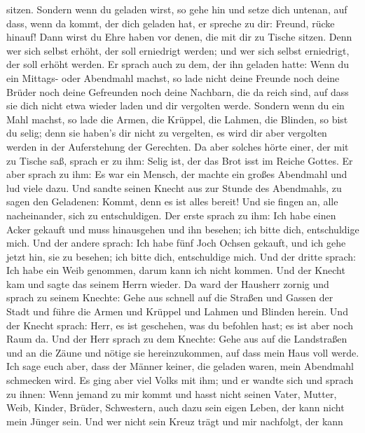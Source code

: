 sitzen.  Sondern wenn du geladen wirst, so gehe hin und
setze dich untenan, auf dass, wenn da kommt, der dich geladen hat, er
spreche zu dir: Freund, rücke hinauf! Dann wirst du Ehre haben vor
denen, die mit dir zu Tische sitzen.  Denn wer sich selbst
erhöht, der soll erniedrigt werden; und wer sich selbst erniedrigt, der
soll erhöht werden.  Er sprach auch zu dem, der ihn geladen
hatte: Wenn du ein Mittags- oder Abendmahl machst, so lade nicht deine
Freunde noch deine Brüder noch deine Gefreunden noch deine Nachbarn, die
da reich sind, auf dass sie dich nicht etwa wieder laden und dir
vergolten werde.  Sondern wenn du ein Mahl machst, so lade
die Armen, die Krüppel, die Lahmen, die Blinden,  so bist
du selig; denn sie haben's dir nicht zu vergelten, es wird dir aber
vergolten werden in der Auferstehung der Gerechten.  Da
aber solches hörte einer, der mit zu Tische saß, sprach er zu ihm: Selig
ist, der das Brot isst im Reiche Gottes.  Er aber sprach zu
ihm: Es war ein Mensch, der machte ein großes Abendmahl und lud viele
dazu.  Und sandte seinen Knecht aus zur Stunde des
Abendmahls, zu sagen den Geladenen: Kommt, denn es ist alles bereit!
 Und sie fingen an, alle nacheinander, sich zu
entschuldigen. Der erste sprach zu ihm: Ich habe einen Acker gekauft und
muss hinausgehen und ihn besehen; ich bitte dich, entschuldige mich.
 Und der andere sprach: Ich habe fünf Joch Ochsen gekauft,
und ich gehe jetzt hin, sie zu besehen; ich bitte dich, entschuldige
mich.  Und der dritte sprach: Ich habe ein Weib genommen,
darum kann ich nicht kommen.  Und der Knecht kam und sagte
das seinem Herrn wieder. Da ward der Hausherr zornig und sprach zu
seinem Knechte: Gehe aus schnell auf die Straßen und Gassen der Stadt
und führe die Armen und Krüppel und Lahmen und Blinden herein.
 Und der Knecht sprach: Herr, es ist geschehen, was du
befohlen hast; es ist aber noch Raum da.  Und der Herr
sprach zu dem Knechte: Gehe aus auf die Landstraßen und an die Zäune und
nötige sie hereinzukommen, auf dass mein Haus voll werde. 
Ich sage euch aber, dass der Männer keiner, die geladen waren, mein
Abendmahl schmecken wird.  Es ging aber viel Volks mit ihm;
und er wandte sich und sprach zu ihnen:  Wenn jemand zu mir
kommt und hasst nicht seinen Vater, Mutter, Weib, Kinder, Brüder,
Schwestern, auch dazu sein eigen Leben, der kann nicht mein Jünger sein.
 Und wer nicht sein Kreuz trägt und mir nachfolgt, der kann
